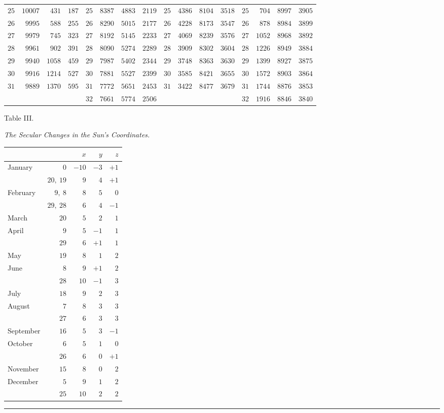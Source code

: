 \begin{center}
{{\begin{minipage}{.96\linewidth}
\begin{tabular}{r|r|r|r||r|r|r|r||r|r|r|r||r|r|r|r}
$25$ & $10007$ & $431$ & $187$ & $25$ & $8387$ & $4883$ & $2119$ & $25$ & $4386$ & $8104$ & $3518$ & $25$ & $704$ & $8997$ & $3905$\\[3pt]
$26$ & $9995$ & $588$ & $255$ & $26$ & $8290$ & $5015$ & $2177$ & $26$ & $4228$ & $8173$ & $3547$ & $26$ & $878$ & $8984$ & $3899$\\
$27$ & $9979$ & $745$ & $323$ & $27$ & $8192$ & $5145$ & $2233$ & $27$ & $4069$ & $8239$ & $3576$ & $27$ & $1052$ & $8968$ & $3892$\\
$28$ & $9961$ & $902$ & $391$ & $28$ & $8090$ & $5274$ & $2289$ & $28$ & $3909$ & $8302$ & $3604$ & $28$ & $1226$ & $8949$ & $3884$\\
$29$ & $9940$ & $1058$ & $459$ & $29$ & $7987$ & $5402$ & $2344$ & $29$ & $3748$ & $8363$ & $3630$ & $29$ & $1399$ & $8927$ & $3875$\\
$30$ & $9916$ & $1214$ & $527$ & $30$ & $7881$ & $5527$ & $2399$ & $30$ & $3585$ & $8421$ & $3655$ & $30$ & $1572$ & $8903$ & $3864$\\[3pt]
$31$ & $9889$ & $1370$ & $595$ & $31$ & $7772$ & $5651$ & $2453$ & $31$ & $3422$ & $8477$ & $3679$ & $31$ & $1744$ & $8876$ & $3853$\\
 &  &  &  & $32$ & $7661$ & $5774$ & $2506$ &  &  &  &  & $32$ & $1916$ & $8846$ & $3840$\\
\end{tabular}\endgroup
\end{minipage}}}\endgroup
\end{center}
\clearpage
{}%
\begin{center}
Table III.

\medskip\emph{The Secular Changes in the Sun’s Coordinates.}\medskip

\begin{tabular}{lr|r|r|r}
&&$x$&$y$&$z$\\\hline
January &$0$&$-10$&$-3$&$+1$\\
&$20,\ 19$&$9$&$4$&$+1$\\
February &$9,\ 8$&$8$&$5$&$0$\\
&$29,\ 28$&$6$&$4$&$-1$\\
March &$20$&$5$&$2$&$1$\\
April &$9$&$5$&$-1$&$1$\\
&$29$&$6$&$+1$&$1$\\
May &$19$&$8$&$1$&$2$\\
June &$8$&$9$&$+1$&$2$\\
&$28$&$10$&$-1$&$3$\\
July &$18$&$9$&$2$&$3$\\
August &$7$&$8$&$3$&$3$\\
&$27$&$6$&$3$&$3$\\
September &$16$&$5$&$3$&$-1$\\
October &$6$&$5$&$1$&$0$\\
&$26$&$6$&$0$&$+1$\\
November &$15$&$8$&$0$&$2$\\
December &$5$&$9$&$1$&$2$\\
&$25$&$10$&$2$&$2$
\end{tabular}
\end{center}
\begin{center}\rule{0.18\linewidth}{0.4pt}\end{center}
